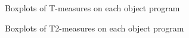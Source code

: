 \documentclass[10pt,journal,compsoc]{IEEEtran}
\begin{document}
\begin{figure}[tp]
	\centering
	\caption{Boxplots of T-measures on each object program}
	\label{fig:Tmeasure}
\end{figure}

\begin{figure}[tp]
	\centering
	\caption{Boxplots of T2-measures on each object program}
	\label{fig:T2measure}
\end{figure}
\end{document}
